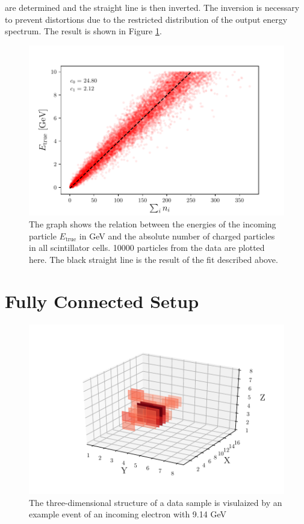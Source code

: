 \documentclass[12pt, a4paper]{thesis}
\begin{document}
are determined and the straight line is then inverted. The inversion
is necessary to prevent distortions due to the restricted distribution
of the output energy spectrum. The result is shown in Figure
\ref{e-vs-sum_n_fit}.


\begin{figure}[hbtp]
  \centering
  \includegraphics[width=.9\linewidth]{../images/e-vs-sum_n_fit.pdf}
  \caption{ The graph shows the relation between the energies of the
    incoming particle \(E_{\text{true}}\) in GeV and the absolute
    number of charged particles in all scintillator cells.  10000
    particles from the data are plotted here. The black straight line
    is the result of the fit described above.}
  \label{e-vs-sum_n_fit}
\end{figure}

\section{Fully Connected Setup}
\label{sec:orgb3e1899}

\begin{figure}[hbtp]
  \centering
  \includegraphics[width=.9\linewidth]{../images/data_display.pdf}
  \caption{The three-dimensional structure of a data sample is
    visulaized by an example event of an incoming electron with 9.14
    GeV}
  \label{data_display}
\end{figure}
\end{document}
